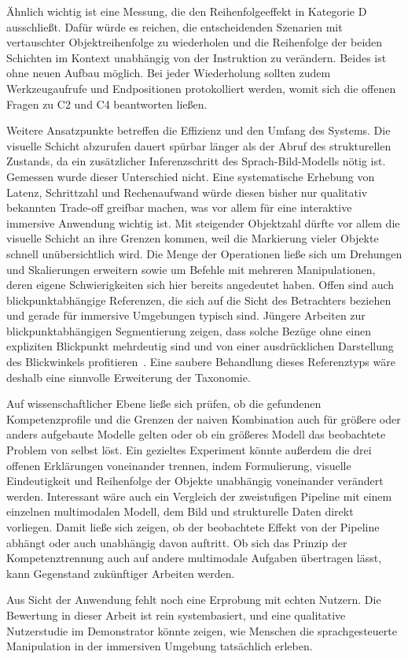 Ähnlich wichtig ist eine Messung, die den Reihenfolgeeffekt in Kategorie D ausschließt.
Dafür würde es reichen, die entscheidenden Szenarien mit vertauschter Objektreihenfolge zu wiederholen und die Reihenfolge der beiden Schichten im Kontext unabhängig von der Instruktion zu verändern.
Beides ist ohne neuen Aufbau möglich.
Bei jeder Wiederholung sollten zudem Werkzeugaufrufe und Endpositionen protokolliert werden, womit sich die offenen Fragen zu C2 und C4 beantworten ließen.

Weitere Ansatzpunkte betreffen die Effizienz und den Umfang des Systems.
Die visuelle Schicht abzurufen dauert spürbar länger als der Abruf des strukturellen Zustands, da ein zusätzlicher Inferenzschritt des Sprach-Bild-Modells nötig ist.
Gemessen wurde dieser Unterschied nicht.
Eine systematische Erhebung von Latenz, Schrittzahl und Rechenaufwand würde diesen bisher nur qualitativ bekannten Trade-off greifbar machen, was vor allem für eine interaktive immersive Anwendung wichtig ist.
Mit steigender Objektzahl dürfte vor allem die visuelle Schicht an ihre Grenzen kommen, weil die Markierung vieler Objekte schnell unübersichtlich wird.
Die Menge der Operationen ließe sich um Drehungen und Skalierungen erweitern sowie um Befehle mit mehreren Manipulationen, deren eigene Schwierigkeiten sich hier bereits angedeutet haben.
Offen sind auch blickpunktabhängige Referenzen, die sich auf die Sicht des Betrachters beziehen und gerade für immersive Umgebungen typisch sind.
Jüngere Arbeiten zur blickpunktabhängigen Segmentierung zeigen, dass solche Bezüge ohne einen expliziten Blickpunkt mehrdeutig sind und von einer ausdrücklichen Darstellung des Blickwinkels profitieren~\cite{nanri2026}.
Eine saubere Behandlung dieses Referenztyps wäre deshalb eine sinnvolle Erweiterung der Taxonomie.

Auf wissenschaftlicher Ebene ließe sich prüfen, ob die gefundenen Kompetenzprofile und die Grenzen der naiven Kombination auch für größere oder anders aufgebaute Modelle gelten oder ob ein größeres Modell das beobachtete Problem von selbst löst.
Ein gezieltes Experiment könnte außerdem die drei offenen Erklärungen voneinander trennen, indem Formulierung, visuelle Eindeutigkeit und Reihenfolge der Objekte unabhängig voneinander verändert werden.
Interessant wäre auch ein Vergleich der zweistufigen Pipeline mit einem einzelnen multimodalen Modell, dem Bild und strukturelle Daten direkt vorliegen.
Damit ließe sich zeigen, ob der beobachtete Effekt von der Pipeline abhängt oder auch unabhängig davon auftritt.
Ob sich das Prinzip der Kompetenztrennung auch auf andere multimodale Aufgaben übertragen lässt, kann Gegenstand zukünftiger Arbeiten werden.

Aus Sicht der Anwendung fehlt noch eine Erprobung mit echten Nutzern.
Die Bewertung in dieser Arbeit ist rein systembasiert, und eine qualitative Nutzerstudie im Demonstrator könnte zeigen, wie Menschen die sprachgesteuerte Manipulation in der immersiven Umgebung tatsächlich erleben.
